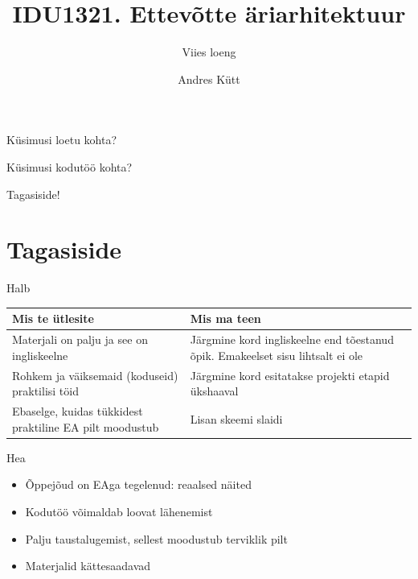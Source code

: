 \documentclass{beamer}
\title{IDU1321. Ettevõtte äriarhitektuur}
\subtitle{Viies loeng}
\author{Andres Kütt}
\institute{Arhitekt}
\begin{document}
\begin{frame}
\titlepage
\end{frame}

\begin{frame}[standout]
Küsimusi loetu kohta?
\end{frame}


\begin{frame}[standout]
Küsimusi kodutöö kohta?
\end{frame}

\begin{frame}[standout]
Tagasiside!
\end{frame}

\section{Tagasiside}
\begin{frame}{Halb}

	\begin{center}
\begin{tabular}{ p{5cm} p{5cm}  }
\textbf{Mis te ütlesite} & \textbf{Mis ma teen}\\
\hline
Materjali on palju ja see on ingliskeelne & Järgmine kord ingliskeelne end tõestanud õpik. Emakeelset sisu lihtsalt ei ole\\ 
Rohkem ja väiksemaid (koduseid) praktilisi töid & Järgmine kord esitatakse projekti etapid ükshaaval\\
Ebaselge, kuidas tükkidest praktiline EA pilt moodustub & Lisan skeemi slaidi\\
\end{tabular}
\end{center}
\end{frame}


\begin{frame}{Hea}
	\begin{itemize}
		\item Õppejõud on EAga tegelenud: reaalsed näited
		\item Kodutöö võimaldab loovat lähenemist
		\item Palju taustalugemist, sellest moodustub terviklik pilt
		\item Materjalid kättesaadavad
	\end{itemize}
\end{frame}
\end{document}
